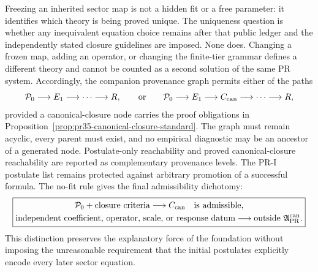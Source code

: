 Freezing an inherited sector map is not a hidden fit or a free parameter: it
identifies which theory is being proved unique.  The uniqueness question is
whether any inequivalent equation choice remains after that public ledger and
the independently stated closure guidelines are imposed.  None does.  Changing
a frozen map, adding an operator, or changing the finite-tier grammar defines a
different theory and cannot be counted as a second solution of the same PR
system. Accordingly, the companion provenance graph permits either of the paths
\begin{equation}
\mathcal P_0\longrightarrow E_1\longrightarrow\cdots\longrightarrow R,
\qquad\text{or}\qquad
\mathcal P_0\longrightarrow E_1\longrightarrow C_{\rm can}
\longrightarrow\cdots\longrightarrow R,
\label{eq:pr35-derivation-path}
\end{equation}
provided a canonical-closure node carries the proof obligations in Proposition~\ref{prop:pr35-canonical-closure-standard}.  The graph must remain acyclic, every parent must exist, and no empirical diagnostic may be an ancestor of a generated node.  Postulate-only reachability and proved canonical-closure reachability are reported as complementary provenance levels. The PR-I postulate list remains protected against arbitrary promotion of a successful formula.  The no-fit rule gives the final admissibility dichotomy:
\begin{equation}
\boxed{
\begin{gathered}
\mathcal P_0+\text{closure criteria}
\longrightarrow C_{\rm can}\quad\text{is admissible},\\
\text{independent coefficient, operator, scale, or response datum}
\longrightarrow\text{outside }\mathfrak A_{\rm PR}^{\rm can}.
\end{gathered}}
\label{eq:pr35-canonical-closure-rule}
\end{equation}
This distinction preserves the explanatory force of the foundation without
imposing the unreasonable requirement that the initial postulates explicitly
encode every later sector equation.
